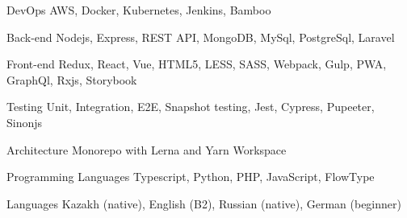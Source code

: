 

\begin{cvskills}

  \cvskill
    {DevOps} %
    {AWS, Docker, Kubernetes, Jenkins, Bamboo} %

  \cvskill
    {Back-end} %
    {Nodejs, Express, REST API, MongoDB, MySql, PostgreSql, Laravel} %

  \cvskill
    {Front-end} %
    {Redux, React, Vue, HTML5, LESS, SASS, Webpack, Gulp, PWA, GraphQl, Rxjs, Storybook} %

  \cvskill
    {Testing} %
    {Unit, Integration, E2E, Snapshot testing, Jest, Cypress, Pupeeter, Sinonjs} 

  \cvskill
    {Architecture} %
      {Monorepo with Lerna and Yarn Workspace} 

  \cvskill
    {Programming Languages} %
    {Typescript, Python, PHP, JavaScript, FlowType} %

  \cvskill
    {Languages} %
    {Kazakh (native), English (B2), Russian (native), German (beginner)} %

\end{cvskills}
